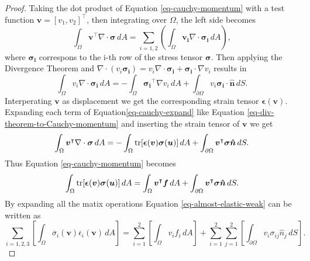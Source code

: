 \documentclass[5pt,a4paper,english]{elsarticle}%
\begin{document}
\begin{proof}
Taking the dot product of  Equation \eqref{eq-cauchy-momentum} with a test function $\boldsymbol{v} = [v_1, v_2]^\intercal$, then integrating over $\Omega$, the left side becomes
\begin{equation} \label{eq-cauchy-expand}
    \int_\Omega{\boldsymbol{v}^\intercal \nabla \cdot \boldsymbol{\sigma}} \,dA = \sum_{i = 1,2}\left(\int_\Omega{\boldsymbol{v_i} \nabla \cdot \boldsymbol{\sigma_i}} \,dA \right),
\end{equation}
where $\boldsymbol{\sigma_i}$ correspons to the i-th row of the stress tensor $\boldsymbol{\sigma}$. 
Then applying the Divergence Theorem and $\nabla \cdot (v_i \boldsymbol{\sigma_i})  = v_i \nabla \cdot \boldsymbol{\sigma_i} + \boldsymbol{\sigma_i} \cdot \nabla v_i$ results in 
\begin{equation} \label{eq-div-theorem-to-Cauchy-momentum}
    \int_\Omega{{v_i} \nabla \cdot \boldsymbol{\sigma_i}}  \,dA = -\int_\Omega{\boldsymbol{\sigma_i}^\intercal \nabla v_i}  \,dA +  \int_{\partial \Omega}{v_i \boldsymbol{\sigma_i} \cdot \boldsymbol{\hat{n}} }  \,dS.
\end{equation}
Interperating $\boldsymbol{v}$ as displacement we get the corresponding strain tensor $\boldsymbol{\epsilon} (\boldsymbol v)$. Expanding each term of Equation\eqref{eq-cauchy-expand} like Equation \eqref{eq-div-theorem-to-Cauchy-momentum} and inserting the strain tensor of $\boldsymbol{v}$ we get
\begin{equation}\label{eq-elastic-weak-left}
    \int_\Omega{\boldsymbol{v}^\intercal \nabla \cdot \boldsymbol{\sigma}} \,dA = -\int_\Omega{\tr[ \boldsymbol{\epsilon}(\boldsymbol v)\boldsymbol{\sigma}(\boldsymbol u)]} \,dA + \int_{\partial \Omega}{\boldsymbol{v}^\intercal \boldsymbol{\sigma}}\boldsymbol{\hat{n} } \,dS.
\end{equation}
Thus Equation \eqref{eq-cauchy-momentum} becomes
\begin{equation} \label{eq-almost-elastic-weak}
    \int_\Omega{\tr[ \boldsymbol{\epsilon}(\boldsymbol v)\boldsymbol{\sigma}(\boldsymbol u)]} \,dA  = \int_\Omega{\boldsymbol{v}^\intercal    \boldsymbol{f}} \,dA + \int_{\partial \Omega}{\boldsymbol{v}^\intercal \boldsymbol{\sigma}}\boldsymbol{\hat{n} } \,dS.
\end{equation}
By expanding all the matix operations Equation \eqref{eq-almost-elastic-weak} can be written as 
\begin{equation}
    \sum_{i = 1,2,3} \left[\int_\Omega{ \overline{\sigma}_i(\boldsymbol v) \overline{\epsilon}_i(\boldsymbol v)}   \,dA \right] = \sum_{i = 1}^2 \left[\int_\Omega{ v_i f_i}   \,dA \right] + \sum_{i = 1}^{2}{{\sum_{j = 1}^{2} \left[\int_{\partial \Omega}{ v_i \sigma_{ij} \hat{n}_j}   \,dS \right]}}. 

\end{equation}
\end{proof}
\end{document}
